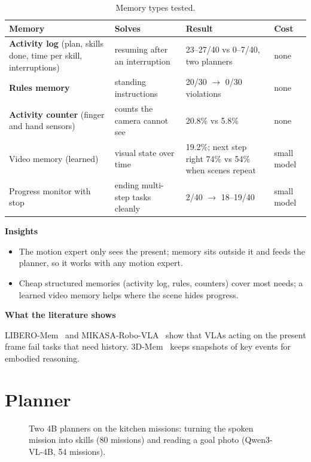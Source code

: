 \documentclass[11pt,a4paper]{article}
\newcommand{\sub}[1]{\par\needspace{4\baselineskip}\smallskip\noindent\textbf{#1}\par}
\begin{document}
\begin{table}[!htbp]\centering\small
\begin{tabularx}{\textwidth}{P{3.6cm}P{3.4cm}YP{1.6cm}}
\toprule
Memory & Solves & Result & Cost \\
\midrule
\textbf{Activity log} (plan, skills done, time per skill, interruptions) & resuming after an interruption & 23--27/40 vs 0--7/40, two planners & none \\
\textbf{Rules memory} & standing instructions & 20/30 $\rightarrow$ 0/30 violations & none \\
\textbf{Activity counter} (finger and hand sensors) & counts the camera cannot see & 20.8\% vs 5.8\% & none \\
Video memory (learned) & visual state over time & 19.2\%; next step right 74\% vs 54\% when scenes repeat & small model \\
Progress monitor with stop & ending multi-step tasks cleanly & 2/40 $\rightarrow$ 18--19/40 & small model \\
\bottomrule
\end{tabularx}
\caption{Memory types tested.}
\label{tab:mem}
\end{table}

\sub{Insights}
\begin{itemize}
\item The motion expert only sees the present; memory sits outside it and feeds the planner, so it works with any motion expert.
\item Cheap structured memories (activity log, rules, counters) cover most needs; a learned video memory helps where the scene hides progress.
\end{itemize}

\sub{What the literature shows}
LIBERO-Mem~\cite{liberomem} and MIKASA-Robo-VLA~\cite{mikasa} show that VLAs acting on the present frame fail tasks that need history. 3D-Mem~\cite{3dmem} keeps snapshots of key events for embodied reasoning.

\section{Planner}
\label{sec:plan}
\begin{figure}[!htbp]\centering
{}
\caption{Two 4B planners on the kitchen missions: turning the spoken mission into skills (80 missions) and reading a goal photo (Qwen3-VL-4B, 54 missions).}
\label{fig:plan}
\end{figure}
\end{document}

